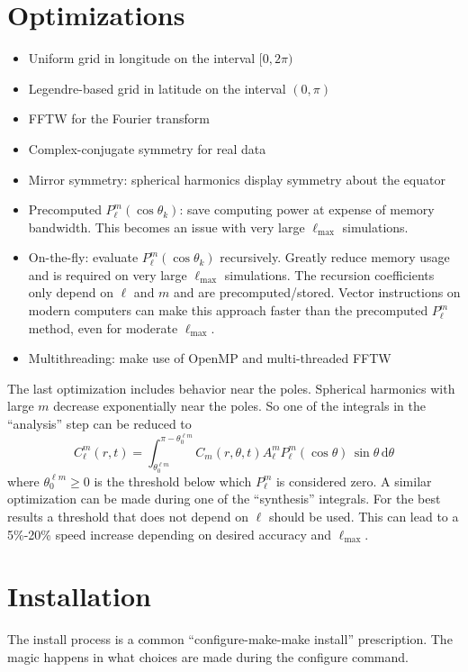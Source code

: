 \documentclass[10pt,letterpaper]{article}
\begin{document}
\section{Optimizations}
\begin{itemize}
  \item Uniform grid in longitude on the interval $[0,2\pi)$
  \item Legendre-based grid in latitude on the interval $(0,\pi)$
  \item FFTW for the Fourier transform
  \item Complex-conjugate symmetry for real data
  \item Mirror symmetry: spherical harmonics display symmetry about the equator
  \item Precomputed $P_\ell^m\left(\cos\theta_k\right)$: save computing power
        at expense of memory bandwidth. This becomes an issue with very large
        $\ell_\mathrm{max}$ simulations.
  \item On-the-fly: evaluate $P_\ell^m\left(\cos\theta_k\right)$ recursively.
        Greatly reduce memory usage and is required
        on very large $\ell_\mathrm{max}$ simulations.
        The recursion coefficients only depend on $\ell$ and $m$ and are
        precomputed/stored. Vector instructions on modern computers can make this
        approach faster than the precomputed $P_\ell^m$ method, even for moderate
        $\ell_\mathrm{max}$.
  \item Multithreading: make use of OpenMP and multi-threaded FFTW
\end{itemize}
The last optimization includes behavior near the poles. Spherical harmonics with
large $m$ decrease exponentially near the poles. So one of the integrals in the
``analysis'' step can be reduced to
\begin{equation}
  C_\ell^m\left(r,t\right) =
                  \int_{\theta_0^{\ell m}}^{\pi-\theta_0^{\ell m}}
              C_m\left(r,\theta,t\right)A_\ell^mP_\ell^m\left(\cos\theta\right)
                  \,\sin\theta\,\mathrm{d}\theta
\end{equation}
where $\theta_0^{\ell m} \geq 0$ is the threshold below which $P_\ell^m$ is considered
zero. A similar optimization can be made during one of the ``synthesis'' integrals.
For the best results a threshold that does not depend on $\ell$ should be used. This
can lead to a 5\%-20\% speed increase depending on desired accuracy and $\ell_\mathrm{max}$.

\section{Installation}
The install process is a common ``configure-make-make install'' prescription. The
magic happens in what choices are made during the configure command.
\end{document}
